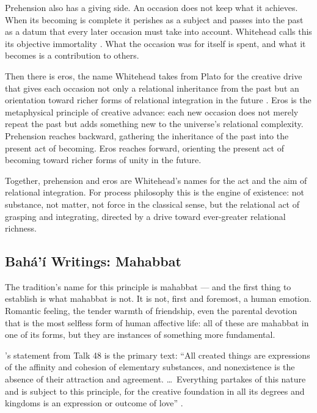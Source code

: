 Prehension also has a giving side. An occasion does not keep what it achieves. When its becoming is complete it perishes as a subject and passes into the past as a datum that every later occasion must take into account. Whitehead calls this its objective immortality \citep{Whitehead1929}. What the occasion was for itself is spent, and what it becomes is a contribution to others.

Then there is eros, the name Whitehead takes from Plato for the creative drive that gives each occasion not only a relational inheritance from the past but an orientation toward richer forms of relational integration in the future \citep{Whitehead1933}. Eros is the metaphysical principle of creative advance: each new occasion does not merely repeat the past but adds something new to the universe's relational complexity. Prehension reaches backward, gathering the inheritance of the past into the present act of becoming. Eros reaches forward, orienting the present act of becoming toward richer forms of unity in the future.

Together, prehension and eros are Whitehead's names for the act and the aim of relational integration. For process philosophy this is the engine of existence: not substance, not matter, not force in the classical sense, but the relational act of grasping and integrating, directed by a drive toward ever-greater relational richness.

\subsection*{Bahá'í Writings: Mahabbat}

The \bahai tradition's name for this principle is mahabbat — and the first thing to establish is what mahabbat is not. It is not, first and foremost, a human emotion. Romantic feeling, the tender warmth of friendship, even the parental devotion that is the most selfless form of human affective life: all of these are mahabbat in one of its forms, but they are instances of something more fundamental.

\AbdulBaha's statement from Talk 48 is the primary text: ``All created things are expressions of the affinity and cohesion of elementary substances, and nonexistence is the absence of their attraction and agreement. \ldots\ Everything partakes of this nature and is subject to this principle, for the creative foundation in all its degrees and kingdoms is an expression or outcome of love'' \citep[Talk 48]{PUP}.

